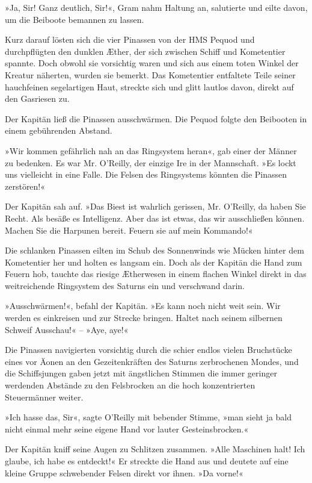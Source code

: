 »Ja, Sir! Ganz deutlich, Sir!«, Gram nahm Haltung an, salutierte
und eilte davon, um die Beiboote bemannen zu lassen.

Kurz darauf lösten sich die vier Pinassen von der HMS Pequod und
durchpflügten den dunklen Æther, der sich zwischen Schiff und
Kometentier spannte. Doch obwohl sie vorsichtig waren und sich aus
einem toten Winkel der Kreatur näherten, wurden sie bemerkt. Das
Kometentier entfaltete Teile seiner hauchfeinen segelartigen Haut,
streckte sich und glitt lautlos davon, direkt auf den Gasriesen
zu.

Der Kapitän ließ die Pinassen ausschwärmen. Die Pequod folgte den
Beibooten in einem gebührenden Abstand.

»Wir kommen gefährlich nah an das Ringsystem heran«, gab einer der
Männer zu bedenken. Es war Mr. O’Reilly, der einzige Ire in der
Mannschaft. »Es lockt uns vielleicht in eine Falle. Die Felsen des
Ringsystems könnten die Pinassen zerstören!«

Der Kapitän sah auf. »Das Biest ist wahrlich gerissen, Mr.
O’Reilly, da haben Sie Recht. Als besäße es Intelligenz. Aber das
ist etwas, das wir ausschließen können. Machen Sie die Harpunen
bereit. Feuern sie auf mein Kommando!«

Die schlanken Pinassen eilten im Schub des Sonnenwinds wie Mücken
hinter dem Kometentier her und holten es langsam ein. Doch als der
Kapitän die Hand zum Feuern hob, tauchte das riesige Ætherwesen in
einem flachen Winkel direkt in das weitreichende Ringsystem des
Saturns ein und verschwand darin.

»Ausschwärmen!«, befahl der Kapitän. »Es kann noch nicht weit sein.
Wir werden es einkreisen und zur Strecke bringen. Haltet nach
seinem silbernen Schweif Ausschau!« – »Aye, aye!«

Die Pinassen navigierten vorsichtig durch die schier endlos vielen
Bruchstücke eines vor Äonen an den Gezeitenkräften des Saturns
zerbrochenen Mondes, und die Schiffsjungen gaben jetzt mit
ängstlichen Stimmen die immer geringer werdenden Abstände zu den
Felsbrocken an die hoch konzentrierten Steuermänner weiter.

»Ich hasse das, Sir«, sagte O’Reilly mit bebender Stimme, »man
sieht ja bald nicht einmal mehr seine eigene Hand vor lauter
Gesteinsbrocken.«

Der Kapitän kniff seine Augen zu Schlitzen zusammen. »Alle
Maschinen halt! Ich glaube, ich habe es entdeckt!« Er streckte die
Hand aus und deutete auf eine kleine Gruppe schwebender Felsen
direkt vor ihnen. »Da vorne!«

